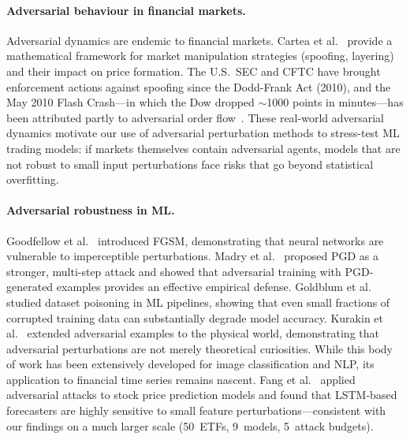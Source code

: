 \documentclass[preprint,review,12pt]{elsarticle}
\begin{document}
\paragraph{Adversarial behaviour in financial markets.}
Adversarial dynamics are endemic to financial markets.
Cartea et al.~\citep{ref_cartea2015} provide a mathematical framework for market manipulation strategies (spoofing, layering) and their impact on price formation.
The U.S.\ SEC and CFTC have brought enforcement actions against spoofing since the Dodd-Frank Act (2010), and the May 2010 Flash Crash---in which the Dow dropped $\sim$1000 points in minutes---has been attributed partly to adversarial order flow~\citep{ref_kirilenko2017}.
These real-world adversarial dynamics motivate our use of adversarial perturbation methods to stress-test ML trading models: if markets themselves contain adversarial agents, models that are not robust to small input perturbations face risks that go beyond statistical overfitting.

\paragraph{Adversarial robustness in ML.}
Goodfellow et al.~\citep{ref_goodfellow_fgsm} introduced FGSM, demonstrating that neural networks are vulnerable to imperceptible perturbations.
Madry et al.~\citep{ref_madry_pgd} proposed PGD as a stronger, multi-step attack and showed that adversarial training with PGD-generated examples provides an effective empirical defense.
Goldblum et al.~\citep{ref_goldblum2022} studied dataset poisoning in ML pipelines, showing that even small fractions of corrupted training data can substantially degrade model accuracy.
Kurakin et al.~\citep{ref_kurakin2017} extended adversarial examples to the physical world, demonstrating that adversarial perturbations are not merely theoretical curiosities.
While this body of work has been extensively developed for image classification and NLP, its application to financial time series remains nascent.
Fang et al.~\citep{ref_fang2022} applied adversarial attacks to stock price prediction models and found that LSTM-based forecasters are highly sensitive to small feature perturbations---consistent with our findings on a much larger scale (50~ETFs, 9~models, 5~attack budgets).
\end{document}
